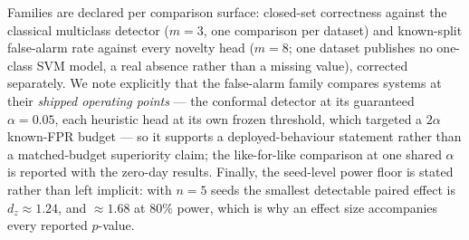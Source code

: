 Families are declared per comparison surface: closed-set correctness against the classical multiclass
detector ($m = 3$, one comparison per dataset) and known-split false-alarm rate against every novelty head
($m = 8$; one dataset publishes no one-class SVM model, a real absence rather than a missing value),
corrected separately. We note explicitly that the false-alarm family compares systems at their
\emph{shipped operating points} --- the conformal detector at its guaranteed $\alpha = 0.05$, each
heuristic head at its own frozen threshold, which targeted a $2\alpha$ known-FPR budget --- so it supports a
deployed-behaviour statement rather than a matched-budget superiority claim; the like-for-like comparison at
one shared $\alpha$ is reported with the zero-day results. Finally, the seed-level power floor is stated
rather than left implicit: with $n = 5$ seeds the smallest detectable paired effect is $d_z \approx 1.24$,
and $\approx 1.68$ at $80\%$ power, which is why an effect size accompanies every reported $p$-value.
